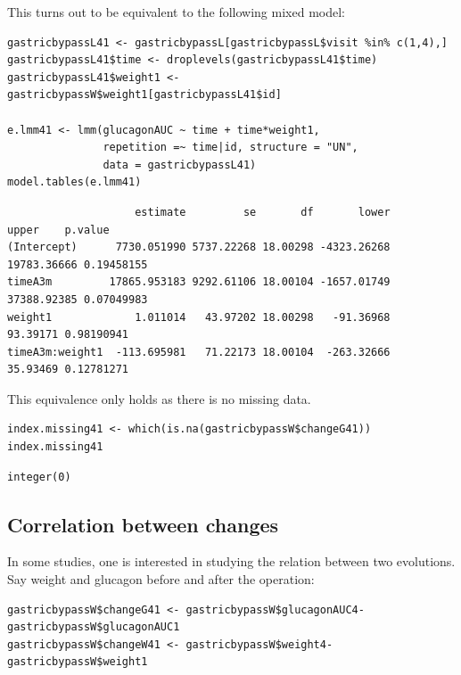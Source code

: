 \documentclass[12pt]{article}
\begin{document}
\clearpage

This turns out to be equivalent to the following mixed model:
\lstset{language=r,label= ,caption= ,captionpos=b,numbers=none}
\begin{lstlisting}
gastricbypassL41 <- gastricbypassL[gastricbypassL$visit %in% c(1,4),]
gastricbypassL41$time <- droplevels(gastricbypassL41$time)
gastricbypassL41$weight1 <- gastricbypassW$weight1[gastricbypassL41$id]

e.lmm41 <- lmm(glucagonAUC ~ time + time*weight1,
               repetition =~ time|id, structure = "UN",
               data = gastricbypassL41)
model.tables(e.lmm41)
\end{lstlisting}

\begin{verbatim}
                    estimate         se       df       lower       upper    p.value
(Intercept)      7730.051990 5737.22268 18.00298 -4323.26268 19783.36666 0.19458155
timeA3m         17865.953183 9292.61106 18.00104 -1657.01749 37388.92385 0.07049983
weight1             1.011014   43.97202 18.00298   -91.36968    93.39171 0.98190941
timeA3m:weight1  -113.695981   71.22173 18.00104  -263.32666    35.93469 0.12781271
\end{verbatim}


This equivalence only holds as there is no missing data.
\lstset{language=r,label= ,caption= ,captionpos=b,numbers=none}
\begin{lstlisting}
index.missing41 <- which(is.na(gastricbypassW$changeG41))
index.missing41
\end{lstlisting}

\begin{verbatim}
integer(0)
\end{verbatim}

\subsection{Correlation between changes}
\label{sec:orgc6197e1}

In some studies, one is interested in studying the relation between
two evolutions. Say weight and glucagon before and after the
operation:
\lstset{language=r,label= ,caption= ,captionpos=b,numbers=none}
\begin{lstlisting}
gastricbypassW$changeG41 <- gastricbypassW$glucagonAUC4-gastricbypassW$glucagonAUC1
gastricbypassW$changeW41 <- gastricbypassW$weight4-gastricbypassW$weight1
\end{lstlisting}
\end{document}
